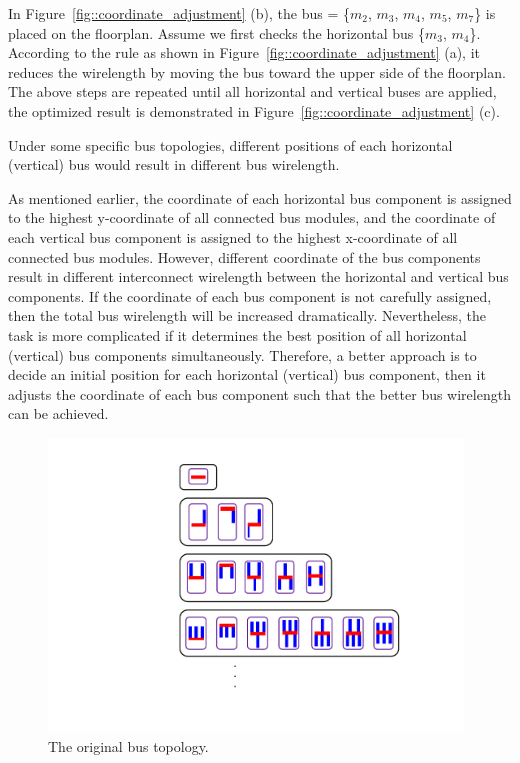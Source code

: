 In Figure~\ref{fig::coordinate_adjustment} (b), the bus = \{$m_2$, $m_3$, $m_4$, $m_5$, $m_7$\}
is placed on the floorplan. Assume we first checks the horizontal bus \{$m_3$, $m_4$\}.
According to the rule as shown in Figure~\ref{fig::coordinate_adjustment} (a), it reduces the wirelength by
moving the bus toward the upper side of the floorplan. The above steps are repeated until all horizontal
and vertical buses are applied, the optimized result is demonstrated in Figure~\ref{fig::coordinate_adjustment} (c).

\begin{Lemma}
Under some specific bus topologies, different positions of each horizontal (vertical) bus
would result in different bus wirelength.
\end{Lemma}

As mentioned earlier, the coordinate of each horizontal bus component is assigned to the highest y-coordinate
of all connected bus modules, and the coordinate of each vertical bus component is assigned to the highest
x-coordinate of all connected bus modules. However, different coordinate of the bus components
result in different interconnect wirelength between the horizontal and vertical bus components.
If the coordinate of each bus component is not carefully assigned,
then the total bus wirelength will be increased dramatically. Nevertheless,
the task is more complicated if it determines the best position of all
horizontal (vertical) bus components simultaneously. Therefore, a better approach is to
decide an initial position for each horizontal (vertical) bus component, then it adjusts
the coordinate of each bus component such that the better bus wirelength can be achieved.

\begin{figure}[htb]
  \centering
    \includegraphics[width=11cm]{Fig/lemma2_1.pdf}
     \caption{
      \small
       The original bus topology.
   }
  \label{fig::lemma2_1}
\end{figure}

